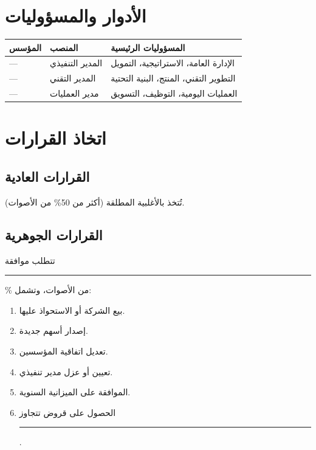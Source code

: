 \documentclass[12pt,a4paper]{article}
\begin{document}
\section{الأدوار والمسؤوليات}
\label{sec:roles}

\begin{table}[H]
\centering
\renewcommand{\arraystretch}{1.5}
\begin{tabularx}{\textwidth}{L{4cm} L{4cm} X}
\toprule
\textbf{المؤسس} & \textbf{المنصب} & \textbf{المسؤوليات الرئيسية} \\
\midrule
--- & المدير التنفيذي & الإدارة العامة، الاستراتيجية، التمويل \\
--- & المدير التقني & التطوير التقني، المنتج، البنية التحتية \\
--- & مدير العمليات & العمليات اليومية، التوظيف، التسويق \\
\bottomrule
\end{tabularx}
\end{table}

\section{اتخاذ القرارات}
\label{sec:decisions}

\subsection{القرارات العادية}
تُتخذ بالأغلبية المطلقة (أكثر من 50\% من الأصوات).

\subsection{القرارات الجوهرية}
تتطلب موافقة \rule{2cm}{0.4pt}\% من الأصوات، وتشمل:
\begin{enumerate}
    \item بيع الشركة أو الاستحواذ عليها.
    \item إصدار أسهم جديدة.
    \item تعديل اتفاقية المؤسسين.
    \item تعيين أو عزل مدير تنفيذي.
    \item الموافقة على الميزانية السنوية.
    \item الحصول على قروض تتجاوز \rule{3cm}{0.4pt} .
\end{enumerate}

\end{document}
